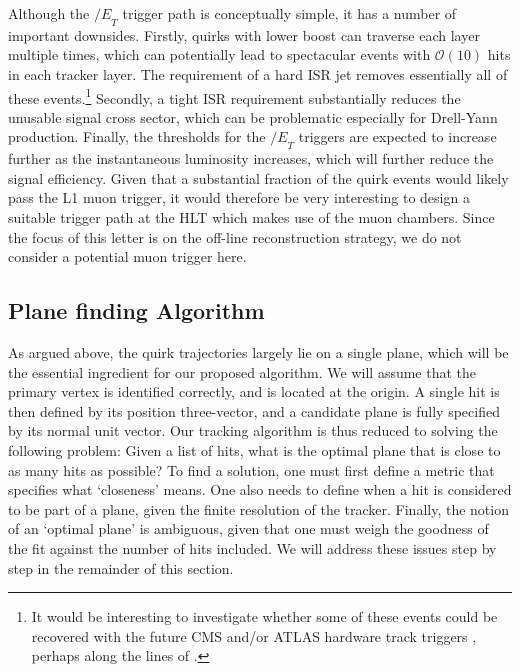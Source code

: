 \documentclass[10pt,aps,prd,nofootinbib,superscriptaddress,twocolumn,preprintnumbers,balancelastpage]{revtex4}
\newcommand{\MET}{{\slash\!\!\!\!E}_{T}}
\begin{document}
Although the $\MET$ trigger path is conceptually simple, it has a number of important downsides. Firstly, quirks with lower boost can traverse each layer multiple times, which can potentially lead to spectacular events with $\mathcal{O}(10)$ hits in each tracker layer. The requirement of a hard ISR jet removes essentially all of these events.\footnote{It would be interesting to investigate whether some of these events could be recovered with the future CMS and/or ATLAS hardware track triggers \cite{Shochet:1552953,Contardo:2020886}, perhaps along the lines of \cite{Gershtein:2017tsv}.} Secondly, a tight ISR requirement substantially reduces the unusable signal cross sector, which can be problematic especially for Drell-Yann production. Finally, the thresholds for the $\MET$ triggers are expected to increase further as the instantaneous luminosity increases, which will further reduce the signal efficiency. Given that a substantial fraction of the quirk events would likely pass the L1 muon trigger, it would therefore be very interesting to design a suitable trigger path at the HLT which makes use of the muon chambers. Since the focus of this letter is on the off-line reconstruction strategy, we do not consider a potential muon trigger here. 

\subsection{Plane finding Algorithm}
\label{sec:algorithm}
As argued above, the quirk trajectories largely lie on a single plane, which will be the essential ingredient for our proposed algorithm. We will assume that the primary vertex is identified correctly, and is located at the origin. A single hit is then defined by its position three-vector, and a candidate plane is fully specified by its normal unit vector. Our tracking algorithm is thus reduced to solving the following problem: Given a list of hits,  what is the optimal plane that is close to as many hits as possible? To find a solution, one must first define a metric that specifies what `closeness' means. One also needs to define when a hit is considered to be part of a plane, given the finite resolution of the tracker. Finally,  the notion of an `optimal plane' is ambiguous, given that one must weigh the goodness of the fit against the number of hits included.  We will address these issues step by step in the remainder of this section.

\end{document}
